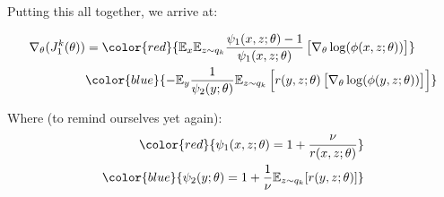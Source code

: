\documentclass[11pt, oneside]{article}
\begin{document}
Putting this all together, we arrive at: 

\begin{align}
\nabla_{\theta}(J_1^k(\theta)) & =  
    \color{red}{ \mathbb{E}_{x} \mathbb{E}_{z \sim q_k} \frac{\psi_1(x, z; \theta) - 1}{\psi_1(x, z; \theta)} 
                \left[ \nabla_{\theta} \log(\phi(x, z; \theta)) \right]} \\
    &\color{blue}{ - \mathbb{E}_y
                 \frac{1}{\psi_2(y; \theta)} 
                \mathbb{E}_{z \sim q_k} \left[ r(y, z; \theta) \left[ \nabla_{\theta} \log(\phi(y, z; \theta)) \right] \right]} \\
\end{align}

Where (to remind ourselves yet again): 
\begin{align}
\color{red}{\psi_1(x, z; \theta) = 1 + \frac{\nu}{r(x, z; \theta)}} \\
\color{blue}{\psi_2(y; \theta) = 1 + \frac{1}{\nu} \mathbb{E}_{z \sim q_k}[r(y, z; \theta)]}
\end{align}

\newpage


\end{document}
